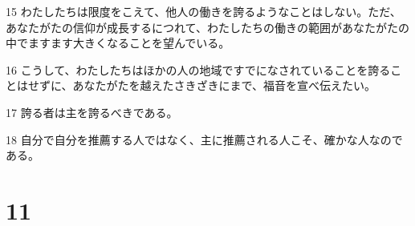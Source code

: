 \par 15 わたしたちは限度をこえて、他人の働きを誇るようなことはしない。ただ、あなたがたの信仰が成長するにつれて、わたしたちの働きの範囲があなたがたの中でますます大きくなることを望んでいる。
\par 16 こうして、わたしたちはほかの人の地域ですでになされていることを誇ることはせずに、あなたがたを越えたさきざきにまで、福音を宣べ伝えたい。
\par 17 誇る者は主を誇るべきである。
\par 18 自分で自分を推薦する人ではなく、主に推薦される人こそ、確かな人なのである。

\chapter{11}

